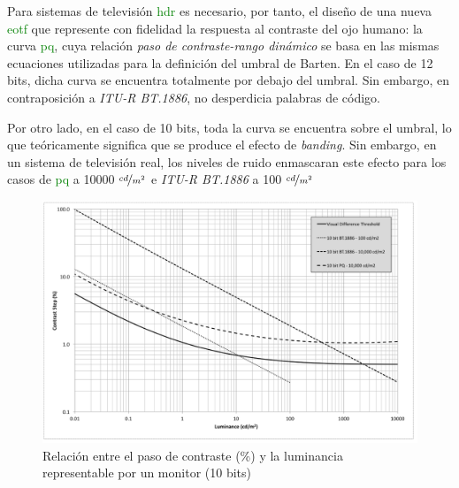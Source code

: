 \documentclass[a4paper, 12pt]{report}
\begin{document}
Para sistemas de televisión \textcolor{green}{hdr} es necesario, por tanto, el diseño de una nueva \textcolor{green}{eotf} que represente con fidelidad la respuesta al contraste del ojo humano: la curva \textcolor{green}{pq}, cuya relación \textit{paso de contraste-rango dinámico} se basa en las mismas ecuaciones utilizadas para la definición del umbral de Barten. En el caso de 12 bits, dicha curva se encuentra totalmente por debajo del umbral. Sin embargo, en contraposición a \textit{ITU-R BT.1886}, no desperdicia palabras de código.

Por otro lado, en el caso de 10 bits, toda la curva se encuentra sobre el umbral, lo que teóricamente significa que se produce el efecto de \textit{banding}. Sin embargo, en un sistema de televisión real, los niveles de ruido enmascaran este efecto para los casos de \textcolor{green}{pq} a 10000 $\nicefrac{cd}{m^{2}}$ e \textit{ITU-R BT.1886} a 100 $\nicefrac{cd}{m^{2}}$

\begin{figure}[H]
  \centering
  \includegraphics[width=12cm, keepaspectratio]{img/4_Formatos_de_TV_HDR/4_4_Agudeza_visual/1_barten_10bits.png}
  \caption{Relación entre el paso de contraste (\%) y la luminancia representable por un monitor (10 bits)}
  \label{fig:barten_10}
\end{figure}
\end{document}
